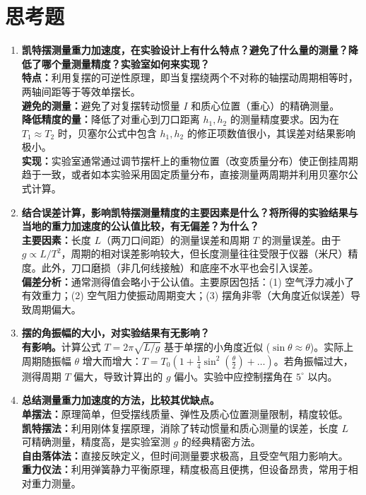 \documentclass[12pt,a4paper]{article}
\begin{document}
\section{思考题}
\begin{enumerate}
    \item \textbf{凯特摆测量重力加速度，在实验设计上有什么特点？避免了什么量的测量？降低了哪个量测量精度？实验室如何来实现？} \\
    \textbf{特点：}利用复摆的可逆性原理，即当复摆绕两个不对称的轴摆动周期相等时，两轴间距等于等效单摆长。\\
    \textbf{避免的测量：}避免了对复摆转动惯量 $I$ 和质心位置（重心）的精确测量。\\
    \textbf{降低精度的量：}降低了对重心到刀口距离 $h_1, h_2$ 的测量精度要求。因为在 $T_1 \approx T_2$ 时，贝塞尔公式中包含 $h_1, h_2$ 的修正项数值很小，其误差对结果影响极小。\\
    \textbf{实现：}实验室通常通过调节摆杆上的重物位置（改变质量分布）使正倒挂周期趋于一致，或者如本实验采用固定质量分布，直接测量两周期并利用贝塞尔公式计算。

    \item \textbf{结合误差计算，影响凯特摆测量精度的主要因素是什么？将所得的实验结果与当地的重力加速度的公认值比较，有无偏差？为什么？} \\
    \textbf{主要因素：}长度 $L$（两刀口间距）的测量误差和周期 $T$ 的测量误差。由于 $g \propto L/T^2$，周期的相对误差影响较大，但长度测量往往受限于仪器（米尺）精度。此外，刀口磨损（非几何线接触）和底座不水平也会引入误差。\\
    \textbf{偏差分析：}通常测得值会略小于公认值。主要原因包括：(1) 空气浮力减小了有效重力；(2) 空气阻力使振动周期变大；(3) 摆角非零（大角度近似误差）导致周期偏大。

    \item \textbf{摆的角振幅的大小，对实验结果有无影响？} \\
    \textbf{有影响。}计算公式 $T=2\pi\sqrt{L/g}$ 基于单摆的小角度近似 ($\sin\theta \approx \theta$)。实际上周期随振幅 $\theta$ 增大而增大：$T = T_0 (1 + \frac{1}{4}\sin^2(\frac{\theta}{2}) + \dots)$。若角振幅过大，测得周期 $T$ 偏大，导致计算出的 $g$ 偏小。实验中应控制摆角在 $5^\circ$ 以内。

    \item \textbf{总结测量重力加速度的方法，比较其优缺点。} \\
    \textbf{单摆法：}原理简单，但受摆线质量、弹性及质心位置测量限制，精度较低。\\
    \textbf{凯特摆法：}利用刚体复摆原理，消除了转动惯量和质心测量的误差，长度 $L$ 可精确测量，精度高，是实验室测 $g$ 的经典精密方法。\\
    \textbf{自由落体法：}直接反映定义，但时间测量要求极高，且受空气阻力影响大。\\
    \textbf{重力仪法：}利用弹簧静力平衡原理，精度极高且便携，但设备昂贵，常用于相对重力测量。


\end{enumerate}
\end{document}
